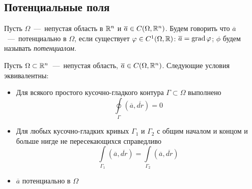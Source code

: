 \subsection{Потенциальные поля}
\begin{definition}
    Пусть $\Omega$~---~непустая область в $\mathbb{R}^n$ и $\overline{a} \in C(\Omega, \mathbb{R}^n)$. Будем говорить что $\overline{a}$~---~потенциально в $\Omega$, если существует $\varphi \in C^1(\Omega, \mathbb{R})$: $\overline{a} = \operatorname{grad} \varphi$; $\phi$ будем называть \textit{потенциалом}.
\end{definition}
\begin{theorem}
    Пусть $\Omega \subset \mathbb{R}^n$~---~непустая область, $\overline{a} \in C(\Omega, \mathbb{R}^n)$. Следующие условия эквивалентны: 
    \begin{itemize}
        \item Для всякого простого кусочно-гладкого контура $\Gamma \subset \Omega$ выполнено \[\oint\limits_\Gamma (\overline{a}, \overline{dr}) = 0\]
        \item Для любых кусочно-гладких кривых $\Gamma_1$ и $\Gamma_2$ с общим началом и концом и больше нигде не пересекающихся справедливо \[\int\limits_{\Gamma_1} (\overline{a}, \overline{dr}) = \int\limits_{\Gamma_2} (\overline{a}, \overline{dr})\]
        \item $\overline{a}$ потенциально в $\Omega$
    \end{itemize}
\end{theorem}
